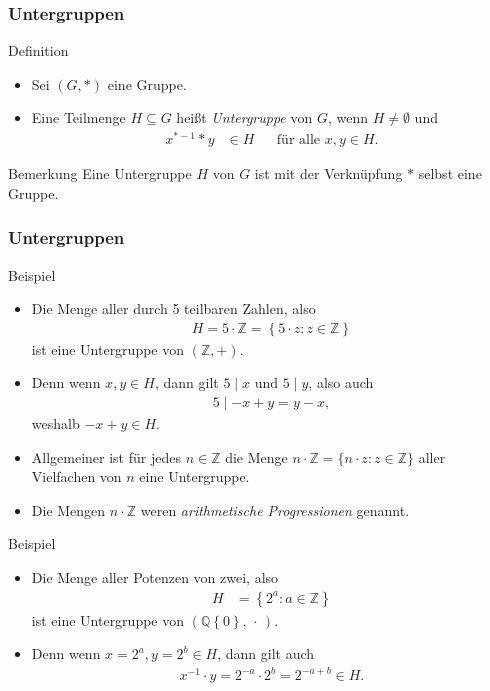 \documentclass{beamer}
\renewcommand{\emph}[1]{{\textcolor{solarizedRed}{\itshape #1}}}
\newcommand\ZZ{\mathbb Z}
\newcommand\QQ{\mathbb Q}
\newcommand\cbc[1]{\left\{{#1}\right\}}
\newcommand{\ue}{\"u}
\begin{document}
\begin{frame}\frametitle{Untergruppen}
	\begin{block}{Definition}
		\begin{itemize}
			\item Sei $(G,*)$ eine Gruppe.
			\item Eine Teilmenge $H\subseteq G$ hei\ss t \emph{Untergruppe} von $G$, wenn $H\neq\emptyset$ und
				\begin{align*}
					x^{*-1}*y&\in H&&\mbox{f\ue r alle }x,y\in H.
				\end{align*}
		\end{itemize}
	\end{block}
	\begin{block}{Bemerkung}
		Eine Untergruppe $H$ von $G$ ist mit der Verkn\ue pfung $*$ selbst eine Gruppe.
	\end{block}
\end{frame}

\begin{frame}\frametitle{Untergruppen}
	\begin{overprint}
		\begin{block}{Beispiel}
			\begin{itemize}
				\item Die Menge aller durch 5 teilbaren Zahlen, also
					\begin{align*}
						H=5\cdot\ZZ=\cbc{5\cdot z:z\in\ZZ}
					\end{align*}
					ist eine Untergruppe von $(\ZZ,+)$.
				\item Denn wenn $x,y\in H$, dann gilt $5\mid x$ und $5\mid y$, also auch
					\begin{align*}
						5\mid -x+y=y-x,
					\end{align*}
					weshalb $-x+y\in H$.
				\item Allgemeiner ist f\ue r jedes $n\in\ZZ$ die Menge $ n\cdot\ZZ=\{n\cdot z:z\in\ZZ\} $ aller Vielfachen von $n$ eine Untergruppe.
				\item Die Mengen $n\cdot\ZZ$ weren \emph{arithmetische Progressionen} genannt.
			\end{itemize}
		\end{block}
		\begin{block}{Beispiel}
			\begin{itemize}
				\item Die Menge aller Potenzen von zwei, also
					\begin{align*}
						H&=\cbc{2^a:a\in\ZZ}
					\end{align*}
					ist eine Untergruppe von $(\QQ\cbc0,\,\cdot\,)$.
				\item Denn wenn $x=2^a,y=2^b\in H$, dann gilt auch
					\begin{align*}
						x^{-1}\cdot y=2^{-a}\cdot 2^b=2^{-a+b}\in H.
					\end{align*}
			\end{itemize}
		\end{block}
	\end{overprint}
\end{frame}
\end{document}
